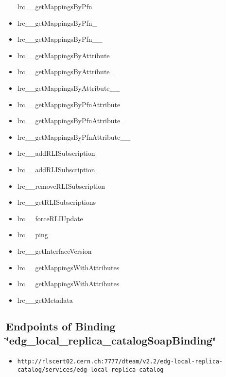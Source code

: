 \begin{itemize}
lrc\_\-\_\-get\-Mappings\-By\-Pfn\item lrc\_\-\_\-get\-Mappings\-By\-Pfn\_\-\item lrc\_\-\_\-get\-Mappings\-By\-Pfn\_\-\_\-\item lrc\_\-\_\-get\-Mappings\-By\-Attribute\item lrc\_\-\_\-get\-Mappings\-By\-Attribute\_\-\item lrc\_\-\_\-get\-Mappings\-By\-Attribute\_\-\_\-\item lrc\_\-\_\-get\-Mappings\-By\-Pfn\-Attribute\item lrc\_\-\_\-get\-Mappings\-By\-Pfn\-Attribute\_\-\item lrc\_\-\_\-get\-Mappings\-By\-Pfn\-Attribute\_\-\_\-\item lrc\_\-\_\-add\-RLISubscription\item lrc\_\-\_\-add\-RLISubscription\_\-\item lrc\_\-\_\-remove\-RLISubscription\item lrc\_\-\_\-get\-RLISubscriptions\item lrc\_\-\_\-force\-RLIUpdate\item lrc\_\-\_\-ping\item lrc\_\-\_\-get\-Interface\-Version\item lrc\_\-\_\-get\-Mappings\-With\-Attributes\item lrc\_\-\_\-get\-Mappings\-With\-Attributes\_\-\item lrc\_\-\_\-get\-Metadata\end{itemize}
\subsection{Endpoints of Binding  \char`\"{}edg\_\-local\_\-replica\_\-catalog\-Soap\-Binding\char`\"{}}\label{edg_local_replica_catalogSoapBinding_edg_local_replica_catalogSoapBinding_ports}
\begin{itemize}
\item \tt{http://rlscert02.cern.ch:7777/dteam/v2.2/edg-local-replica-catalog/services/edg-local-replica-catalog} \end{itemize}
